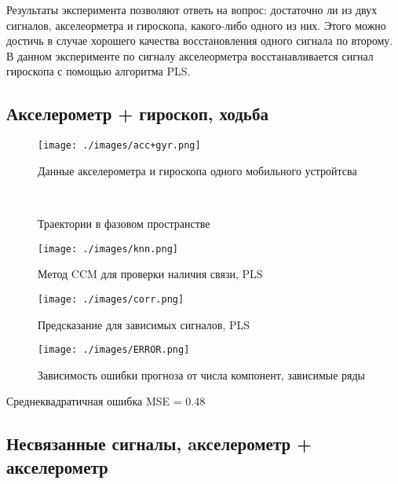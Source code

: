 \documentclass[12pt]{extarticle}
\begin{document}
Результаты эксперимента позволяют ответь на вопрос: достаточно ли из двух сигналов, акселеорметра и гироскопа, какого-либо одного из них. Этого можно достичь в случае хорошего качества восстановления одного сигнала по второму. В данном эксперименте по сигналу акселеорметра восстанавливается сигнал гироскопа с помощью алгоритма PLS.

\subsection{Акселерометр + гироскоп, ходьба}

\begin{figure}[h!]
\centering
{\texttt{[image: ./images/acc+gyr.png]}}
\caption{Данные акселерометра и гироскопа одного мобильного устройтсва}
\label{fg:signal}
\end{figure}

\begin{figure}[h!]
\centering
  \\
\caption{Траектории в фазовом пространстве}
\label{fg:initial_traj}
\end{figure}


\begin{figure}[h!]
\centering
{\texttt{[image: ./images/knn.png]}}
\caption{Метод CCM для проверки наличия связи, PLS}
\label{fg:signal}
\end{figure}


\begin{figure}[h!]
\centering
{\texttt{[image: ./images/corr.png]}}
\caption{Предсказание для зависимых сигналов, PLS}
\label{fg:signal}
\end{figure}

\begin{figure}[h!]
\centering
{\texttt{[image: ./images/ERROR.png]}}
\caption{Зависимость ошибки прогноза от числа компонент, зависимые ряды}
\label{fg:signal}
\end{figure}

Среднеквадратичная ошибка MSE = 0.48

\newpage 

\subsection{Несвязанные сигналы, aкселерометр + акселерометр}
\end{document}
